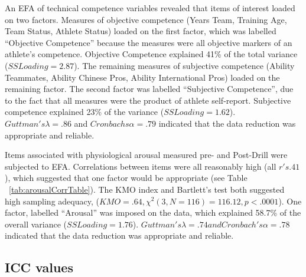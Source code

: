 An EFA of technical competence variables revealed that items of interest loaded on two factors. Measures of objective competence (Years Team, Training Age, Team Status, Athlete Status) loaded on the first factor, which was labelled ``Objective Competence'' because the measures were all objective markers of an athlete's competence.
Objective Competence explained 41\% of the total variance ($SS Loading = 2.87$).  The remaining measures of subjective competence (Ability Teammates, Ability Chinese Pros, Ability International Pros) loaded on the remaining factor.  The second factor was labelled ``Subjective Competence'', due to the fact that all measures were the product of athlete self-report.  Subjective competence explained 23\% of the variance ($SS Loading = 1.62$).  $Guttman's \lambda = .86$ and $Cronbachs \alpha = .79$ indicated that the data reduction was appropriate and reliable.

Items associated with physiological arousal measured pre- and Post-Drill were subjected to EFA.
Correlations between items were all reasonably high (all $r's  .41$), which suggested that one factor would be appropriate (see Table ~\ref{tab:arousalCorrTable}). The KMO index and Bartlett's test both suggested high sampling adequacy, ($KMO = .64, \chi^2(3, N = 116) = 116.12, p < .0001$).  One factor, labelled ``Arousal'' was imposed on the data, which explained 58.7\% of the overall variance ($SS Loading = 1.76$).  $Guttman's \lambda = .74 and  Cronbach's \alpha = .78$  indicated that the data reduction was appropriate and reliable.












\subsection{ICC values}

